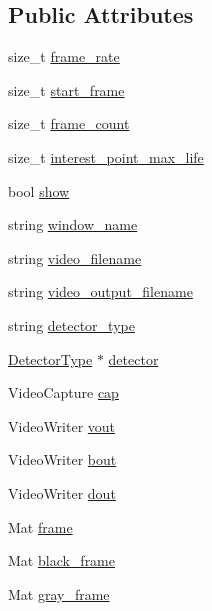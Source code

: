 \subsection*{\-Public \-Attributes}
\begin{DoxyCompactItemize}
\item 
size\-\_\-t \hyperlink{class_options_a466a2a141ee2c3ecb3082566ede72ad3}{frame\-\_\-rate}
\item 
size\-\_\-t \hyperlink{class_options_ab9c7cf4df6590dfc009342a9ac562c8e}{start\-\_\-frame}
\item 
size\-\_\-t \hyperlink{class_options_ae7e3cc6bb484ec7e060175d5c6be9fbf}{frame\-\_\-count}
\item 
size\-\_\-t \hyperlink{class_options_ad83ab0070ddb7097311ee3dd2cecabb3}{interest\-\_\-point\-\_\-max\-\_\-life}
\item 
bool \hyperlink{class_options_a0daf1af70609b4d1d1ef633c459dcdbb}{show}
\item 
string \hyperlink{class_options_a0731ed6ef24da67231661711fd29a881}{window\-\_\-name}
\item 
string \hyperlink{class_options_a9bae124c8f4d7fff8bb26d319967671e}{video\-\_\-filename}
\item 
string \hyperlink{class_options_a13788968dfa22a22acc91a75a7711fe6}{video\-\_\-output\-\_\-filename}
\item 
string \hyperlink{class_options_a6536c55b2f8fc227d0fad5a2bdcf86b9}{detector\-\_\-type}
\item 
\hyperlink{class_detector_type}{\-Detector\-Type} $\ast$ \hyperlink{class_options_ad830e7ecedc377b3536ed4c2e013a2dd}{detector}
\item 
\-Video\-Capture \hyperlink{class_options_a3c6618c646e82eac20efed6796817796}{cap}
\item 
\-Video\-Writer \hyperlink{class_options_a9bc8c4fa5ddb3adff79c1cb565609bcd}{vout}
\item 
\-Video\-Writer \hyperlink{class_options_a05a239b7ee3dc2731c2e929af24070ef}{bout}
\item 
\-Video\-Writer \hyperlink{class_options_ac7d37c6cfee9fe03a81c4f0ee7675c75}{dout}
\item 
\-Mat \hyperlink{class_options_a646673694931bcbc0065c55738e3dd29}{frame}
\item 
\-Mat \hyperlink{class_options_a4e645876f0f2ebac9b9fad5d66162aaa}{black\-\_\-frame}
\item 
\-Mat \hyperlink{class_options_a248f35435160e654dc509fa347afd6e4}{gray\-\_\-frame}
\item 

\end{DoxyCompactItemize}
